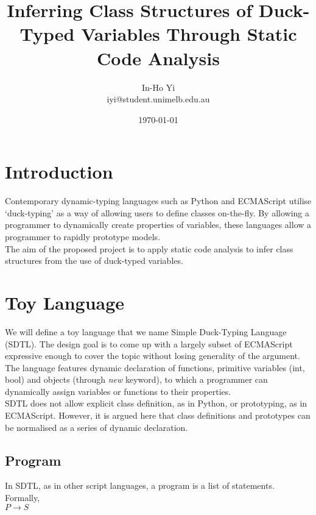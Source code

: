 \documentclass[a4paper,12pt]{article}
\begin{document}
\title{Inferring Class Structures of Duck-Typed Variables Through Static Code Analysis}
\author{In-Ho Yi\\
iyi@student.unimelb.edu.au
}
\date{\today}
\maketitle
\section{Introduction}
Contemporary dynamic-typing languages such as Python and ECMAScript utilise `duck-typing' as a way of allowing users to define classes on-the-fly. By allowing a programmer to dynamically create properties of variables, these languages allow a programmer to rapidly prototype models.\\
The aim of the proposed project is to apply static code analysis to infer class structures from the use of duck-typed variables. 
\section{Toy Language}
We will define a toy language that we name Simple Duck-Typing Language (SDTL). The design goal is to come up with a largely subset of ECMAScript expressive enough to cover the topic without losing generality of the argument. The language features dynamic declaration of functions, primitive variables (int, bool) and objects (through \textit{new} keyword), to which a programmer can dynamically assign variables or functions to their properties.\\
SDTL does not allow explicit class definition, as in Python, or prototyping, as in ECMAScript. However, it is argued here that class definitions and prototypes can be normalised as a series of dynamic declaration.\\

\subsection{Program}
In SDTL, as in other script languages, a program is a list of statements. Formally,\\
$P \rightarrow S$\\
\end{document}
